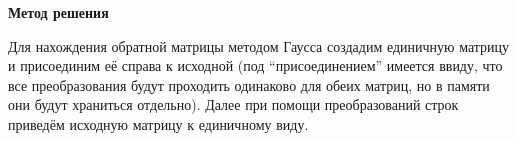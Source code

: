 \textbf{\large Метод решения}

Для нахождения обратной матрицы методом Гаусса создадим единичную матрицу и присоединим её справа к исходной (под \enquote{присоединением} имеется ввиду, что все преобразования будут проходить одинаково для обеих матриц, но в памяти они будут храниться отдельно). Далее при помощи преобразований строк приведём исходную матрицу к единичному виду.

